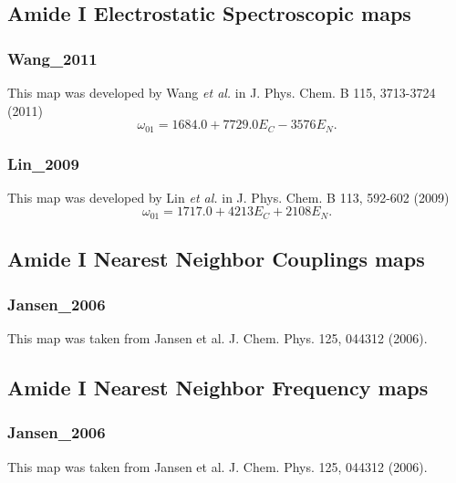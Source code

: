 \documentclass{article}
\begin{document}
\subsection{\label{sec:aImaps}Amide I Electrostatic Spectroscopic maps}
\subsubsection{Wang\_2011}
This map was developed by Wang \textit{et al.} in J. Phys. Chem. B 115, 3713-3724 (2011)
\begin{equation}
\omega_{01} = 1684.0 + 7729.0E_C - 3576 E_N.
\end{equation}

\subsubsection{Lin\_2009}
This map was developed by Lin \textit{et al.} in J. Phys. Chem. B 113, 592-602 (2009)
\begin{equation}
\omega_{01} = 1717.0 + 4213 E_C + 2108 E_N.
\end{equation}

\subsection{\label{sec:aImapsnnc}Amide I Nearest Neighbor Couplings maps}
\subsubsection{Jansen\_2006}
This map was taken from Jansen et al. J. Chem. Phys. 125, 044312 (2006).

\subsection{\label{sec:aImapsnn}Amide I Nearest Neighbor Frequency maps}
\subsubsection{Jansen\_2006}
This map was taken from Jansen et al. J. Chem. Phys. 125, 044312 (2006).
\end{document}
